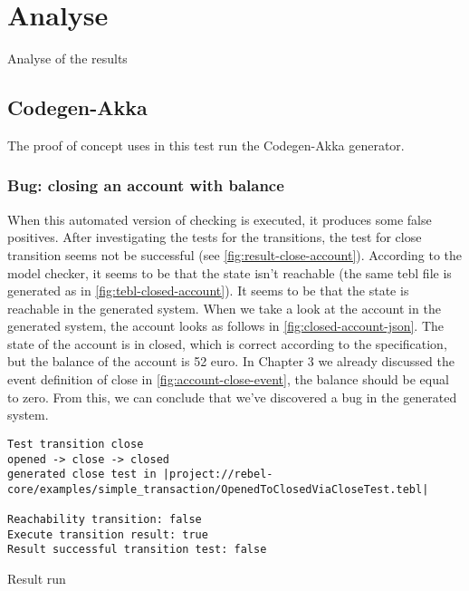 \section{Analyse}
Analyse of the results

\subsection{Codegen-Akka}
The proof of concept uses in this test run the Codegen-Akka generator.

\subsubsection{Bug: closing an account with balance}
\label{sec:bug-close-account}
When this automated version of checking is executed, it produces some false
positives. After investigating the tests for the transitions, the test for close
transition seems not be successful (see \autoref{fig:result-close-account}).
According to the model checker, it seems to be that the state isn't reachable
(the same tebl file is generated as in \autoref{fig:tebl-closed-account}). It
seems to be that the state is reachable in the generated system. When we take a
look at the account in the generated system, the account looks as follows in
\autoref{fig:closed-account-json}. The state of the account is in closed, which
is correct according to the specification, but the balance of the account is 52
euro. In Chapter 3 we already discussed the event definition of close in
\autoref{fig:account-close-event}, the balance should be equal to zero. From
this, we can conclude that we've discovered a bug in the generated system.



\begin{sourcecode}[h!]
\begin{lstlisting}[]
Test transition close
opened -> close -> closed
generated close test in |project://rebel-core/examples/simple_transaction/OpenedToClosedViaCloseTest.tebl|

Reachability transition: false
Execute transition result: true
Result successful transition test: false
\end{lstlisting}
\caption{Result run}
\label{fig:result-close-account}
\end{sourcecode}

